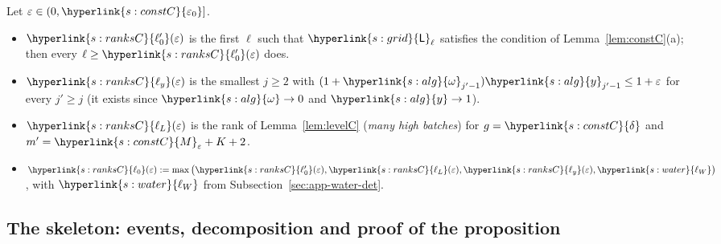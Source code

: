 \documentclass[10pt]{article}
\newcommand{\dt}[1]{\hypertarget{#1}{}}
\newcommand{\sy}[2]{{\hyperlink{#1}{#2}}}
\newcommand{\1}{\mathbf{1}}
\newcommand{\Lg}{\sy{s:grid}{\mathsf L}}
\newcommand{\yg}{\sy{s:alg}{y}}
\newcommand{\om}{\sy{s:alg}{\omega}}
\newcommand{\ez}{\sy{s:constC}{\varepsilon_0}}
\newcommand{\dl}{\sy{s:constC}{\delta}}
\newcommand{\Me}{\sy{s:constC}{M}}
\newcommand{\lzp}{\sy{s:ranksC}{\ell'_0}}
\newcommand{\ly}{\sy{s:ranksC}{\ell_y}}
\newcommand{\lonez}{\sy{s:ranksC}{\ell_L}}
\newcommand{\lz}{\sy{s:ranksC}{\ell_0}}
\newcommand{\lW}{\sy{s:water}{\ell_W}}
\begin{document}
\begin{definition}[ranks when $x=1$]\label{def:ranksC}\dt{s:ranksC}
Let $\varepsilon\in(0,\ez]$.
\begin{itemize}
\item $\lzp(\varepsilon)$ is the first $\ell$ such that $\Lg_\ell$ satisfies the condition of Lemma~\ref{lem:constC}(a); then every $\ell\ge\lzp(\varepsilon)$ does.
\item $\ly(\varepsilon)$ is the smallest $j\ge2$ with $(1+\om_{j'-1})\yg_{j'-1}\le1+\varepsilon$ for every $j'\ge j$ (it exists since $\om\to0$ and $\yg\to1$).
\item $\lonez(\varepsilon)$ is the rank of Lemma~\ref{lem:levelC} (\emph{many high batches}) for $g=\dl$ and $m'=\Me_\varepsilon+K+2$.
\item $\lz(\varepsilon):=\max\big(\lzp(\varepsilon),\lonez(\varepsilon),\ly(\varepsilon),\lW\big)$, with $\lW$ from Subsection~\ref{sec:app-water-det}.
\end{itemize}
\end{definition}

\subsection{The skeleton: events, decomposition and proof of the proposition}\label{sec:app-skelC}
\end{document}
